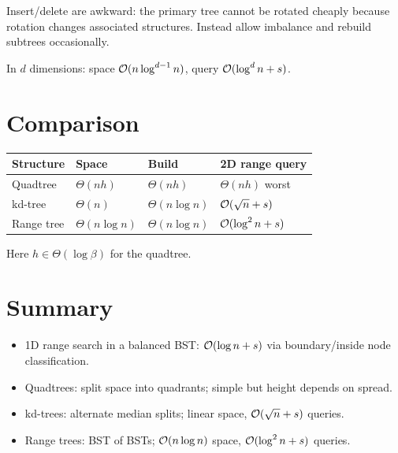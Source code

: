 Insert/delete are awkward: the primary tree cannot be rotated cheaply because
rotation changes associated structures. Instead allow imbalance and rebuild
subtrees occasionally.

In $d$ dimensions: space $\mathcal{O}(n \log^{d-1} n)$, query $\mathcal{O}(\log^d n + s)$.

\section{Comparison}

\begin{center}
\begin{tabular}{llll}
\toprule
Structure & Space & Build & 2D range query\\
\midrule
Quadtree & $\Theta(nh)$ & $\Theta(nh)$ & $\Theta(nh)$ worst\\
kd-tree & $\Theta(n)$ & $\Theta(n\log n)$ & $\mathcal{O}(\sqrt n + s)$\\
Range tree & $\Theta(n\log n)$ & $\Theta(n\log n)$ & $\mathcal{O}(\log^2 n + s)$\\
\bottomrule
\end{tabular}
\end{center}
Here $h \in \Theta(\log \beta)$ for the quadtree.

\section{Summary}
\begin{itemize}
  \item 1D range search in a balanced BST: $\mathcal{O}(\log n + s)$ via boundary/inside
        node classification.
  \item Quadtrees: split space into quadrants; simple but height depends on spread.
  \item kd-trees: alternate median splits; linear space, $\mathcal{O}(\sqrt n + s)$ queries.
  \item Range trees: BST of BSTs; $\mathcal{O}(n\log n)$ space, $\mathcal{O}(\log^2 n + s)$ queries.
\end{itemize}
